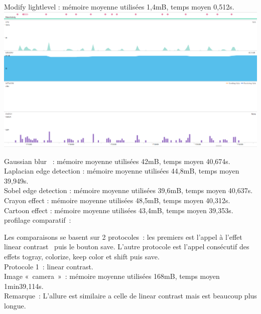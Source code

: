 \documentclass[12pt]{article}
\begin{document}
    Modify lightlevel : mémoire moyenne utilisées 1,4mB, temps moyen 0,512s.\\



    \includegraphics{modifylight}




    Gaussian blur  : mémoire moyenne utilisées 42mB, temps moyen 40,674s.\\


    Laplacian edge detection : mémoire moyenne utilisées 44,8mB, temps moyen 39,949s.\\


    Sobel edge detection : mémoire moyenne utilisées 39,6mB, temps moyen 40,637s.\\


    Crayon effect : mémoire moyenne utilisées 48,5mB, temps moyen 40,312s.\\


    Cartoon effect : mémoire moyenne utilisées 43,4mB, temps moyen 39,353s.\\



    profilage comparatif :

    Les comparaisons se basent sur 2 protocoles : les premiers est l’appel à l’effet linear contrast  puis le bouton save. L’autre protocole est l’appel consécutif des effets togray, colorize, keep color et shift puis save. \\


    Protocole 1 : linear contrast.\\

    Image « camera » : mémoire moyenne utilisées 168mB, temps moyen 1min39,114s.\\

    Remarque :
    L’allure est similaire a celle de linear contrast mais est beaucoup plus longue. \\
\end{document}

